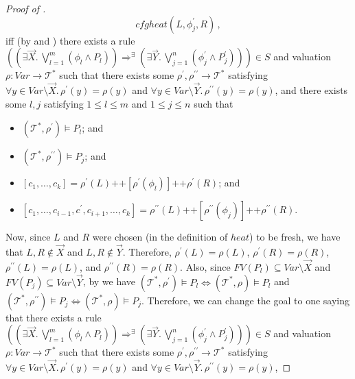 \documentclass{article}
\begin{document}
\begin{proof}[Proof of ]
\begin{equation*}
    \mathit{cfgheat}(L, \phi^\prime_j, R) \, ,
\end{equation*}
iff (by  and )
there exists a rule $((\exists \vec{X}.\, \bigvee_{l=1}^{m} (\phi_l \land P_l)) \Rightarrow^\exists (\exists \vec{Y}.\, \bigvee_{j=1}^{n} (\phi^\prime_j \land P^\prime_j))) \in S$
and valuation $\rho : \mathit{Var} \to \mathcal{T}^*$ such that
there exists some $\rho^\prime,\rho^{\prime\prime} \to \mathcal{T}^*$
satisfying $\forall y \in \mathit{Var} \setminus \vec{X}.\, \rho^\prime(y) = \rho(y)$
and $\forall y \in \mathit{Var} \setminus \vec{Y}.\, \rho^{\prime\prime}(y) = \rho(y)$,
and there exists some $l,j$ satisfying $1 \leq l \leq m$ and $1 \leq j \leq n$ such that
\begin{itemize}
    \item $(\mathcal{T}^*, \rho^\prime) \vDash P_l$; and
    \item $(\mathcal{T}^*, \rho^{\prime\prime}) \vDash P_j$; and
    \item $[c_1,\ldots,c_k] = \rho^\prime(L) \texttt{++} [\rho^\prime(\phi_l)] \texttt{++} \rho^\prime(R)$; and
    \item $[c_1, \ldots, c_{i-1}, c^\prime, c_{i+1}, \ldots, c_k] = \rho^{\prime\prime}(L)
    \texttt{++} [\rho^{\prime\prime}(\phi_j)] \texttt{++} \rho^{\prime\prime}(R)$.
\end{itemize}
Now, since $L$ and $R$ were chosen (in the definition of $\mathit{heat}$) to be fresh, we have that
$L,R \not\in \vec{X}$ and $L,R \not\in \vec{Y}$. Therefore,
$\rho^\prime(L) = \rho(L)$, $\rho^\prime(R) = \rho(R)$,
$\rho^{\prime\prime}(L) = \rho(L)$, and $\rho^{\prime\prime}(R) = \rho(R)$.
Also, since $\mathit{FV}(P_l) \subseteq \mathit{Var} \setminus \vec{X}$
and $\mathit{FV}(P_j) \subseteq \mathit{Var} \setminus \vec{Y}$,
by  we have $(\mathcal{T}^*, \rho^\prime) \vDash P_l \iff (\mathcal{T}^*, \rho) \vDash P_l$
and $(\mathcal{T}^*, \rho^{\prime\prime}) \vDash P_j \iff (\mathcal{T}^*, \rho) \vDash P_j$.
Therefore, we can change the goal to one saying that
there exists a rule $((\exists \vec{X}.\, \bigvee_{l=1}^{m} (\phi_l \land P_l)) \Rightarrow^\exists (\exists \vec{Y}.\, \bigvee_{j=1}^{n} (\phi^\prime_j \land P^\prime_j))) \in S$
and valuation $\rho : \mathit{Var} \to \mathcal{T}^*$ such that
there exists some $\rho^\prime,\rho^{\prime\prime} \to \mathcal{T}^*$
satisfying $\forall y \in \mathit{Var} \setminus \vec{X}.\, \rho^\prime(y) = \rho(y)$
and $\forall y \in \mathit{Var} \setminus \vec{Y}.\, \rho^{\prime\prime}(y) = \rho(y)$,

\end{proof}
\end{document}
